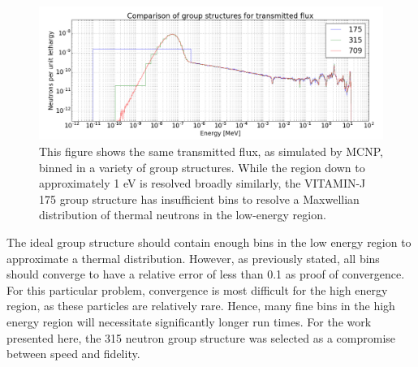 \begin{figure}[H]
  \includegraphics[width=\textwidth]{shield_flux_by_group.png}
  \caption[Group structure comparison.]{This figure shows the same transmitted flux, as simulated by MCNP, binned in a variety of group structures. While the region down to approximately 1 eV is resolved broadly similarly, the VITAMIN-J 175 group structure has insufficient bins to resolve a Maxwellian distribution of thermal neutrons in the low-energy region.}
  \label{fig:neutron_group_comparison}
\end{figure}

The ideal group structure should contain enough bins in the low energy region to approximate a thermal distribution. However, as previously stated, all bins should converge to have a relative error of less than 0.1 as proof of convergence. For this particular problem, convergence is most difficult for the high energy region, as these particles are relatively rare. Hence, many fine bins in the high energy region will necessitate significantly longer run times. For the work presented here, the 315 neutron group structure was selected as a compromise between speed and fidelity.


